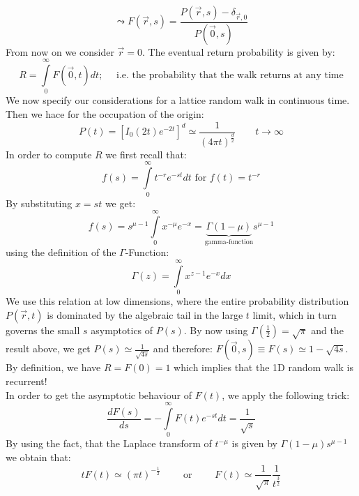 \begin{equation*}
	\leadsto F(\vec{r},s)=\frac{P(\vec{r},s)-\delta_{\vec{r},0}}{P(\vec{0},s)}
\end{equation*}
From now on we consider $\vec{r}=0$. The eventual return probability is given by:
\begin{equation*}
	R=\int\limits_0^\infty F(\vec{0},t)dt; \quad \text{ i.e. the probability that the walk returns at any time}
\end{equation*}
We now specify our considerations for a lattice random walk in continuous time. Then we hace for the occupation of the origin:
\begin{equation*}
	P(t)=\left[I_0(2t)e^{-2t}\right]^d\simeq \frac{1}{(4\pi t)^\frac{d}{2}} \qquad t\to\infty
\end{equation*}
In order to compute $R$ we first recall that:
\begin{equation*}
	f(s)=\int\limits_0^\infty t^{-r}e^{-st}dt \text{ for $f(t)=t^{-r}$}
\end{equation*}
By substituting $x=st$ we get:
\begin{equation*}
	f(s)=s^{\mu-1}\int\limits_0^\infty x^{-\mu}e^{-x}=\underset{\text{gamma-function}}{\underbrace{\Gamma(1-\mu)}}s^{\mu-1}
\end{equation*}
using the definition of the $\Gamma$-Function:
\begin{equation*}
	\Gamma(z)=\int\limits_0^\infty x^{z-1}e^{-x}dx
\end{equation*}
We use this relation at low dimensions, where the entire probability distribution $P(\vec{r},t)$ is dominated by the algebraic tail in the large $t$ limit, which in turn governs the small $s$ asymptotics of $P(s)$.
By now using $\Gamma\left(\frac{1}{2}\right)=\sqrt{\pi}$ and the result above, we get $P(s)\simeq\frac{1}{\sqrt{4s}}$ and therefore: $F(\vec{0},s)\equiv F(s)\simeq 1-\sqrt{4s}$.\\
By definition, we have $R=F(0)=1$ which implies that the 1D random walk is recurrent!\\
In order to get the asymptotic behaviour of $F(t)$, we apply the following trick:
\begin{equation*}
	\frac{dF(s)}{ds}=-\int\limits_0^\infty F(t)e^{-st}dt=\frac{1}{\sqrt{s}}
\end{equation*}
By using the fact, that the Laplace transform of $t^{-\mu}$ is given by $\Gamma(1-\mu)s^{\mu-1}$ we obtain that:
\begin{equation*}
	tF(t)\simeq (\pi t)^{-\frac{1}{2}} \qquad\text{ or }\qquad F(t)\simeq\frac{1}{\sqrt{\pi}}\frac{1}{t^\frac{3}{2}}
\end{equation*}

